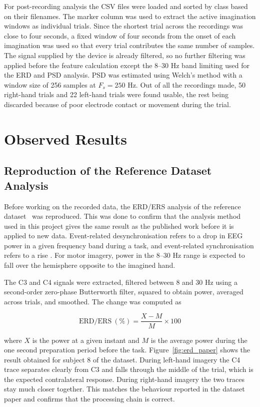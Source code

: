 For post-recording analysis the CSV files were loaded and sorted by class based on their
filenames. The marker column was used to extract the active imagination windows as
individual trials. Since the shortest trial across the recordings was close to four
seconds, a fixed window of four seconds from the onset of each imagination was used so that
every trial contributes the same number of samples. The signal supplied by the device is
already filtered, so no further filtering was applied before the feature calculation except
the 8--30 Hz band limiting used for the ERD and PSD analysis. PSD was estimated using
Welch's method \cite{welch1967} with a window size of 256 samples at $F_s = 250$ Hz. Out of all the
recordings made, 50 right-hand trials and 22 left-hand trials were found usable, the rest
being discarded because of poor electrode contact or movement during the trial.

\FloatBarrier

\section{Observed Results}

\subsection{Reproduction of the Reference Dataset Analysis}

Before working on the recorded data, the ERD/ERS analysis of the reference
dataset~\cite{liu2024mi} was reproduced. This was done to confirm that the analysis method
used in this project gives the same result as the published work before it is applied to
new data. Event-related desynchronisation refers to a drop in EEG power in a given
frequency band during a task, and event-related synchronisation refers to a rise
\cite{pfurtscheller1999erd}. For motor
imagery, power in the 8--30 Hz range is expected to fall over the hemisphere opposite to
the imagined hand.

The C3 and C4 signals were extracted, filtered between 8 and 30 Hz using a second-order
zero-phase Butterworth filter, squared to obtain power, averaged across trials, and
smoothed. The change was computed as

\begin{equation}
\mathrm{ERD/ERS}~(\%) = \frac{X - M}{M} \times 100
\end{equation}

where $X$ is the power at a given instant and $M$ is the average power during the one
second preparation period before the task. Figure~\ref{fig:erd_paper} shows the result
obtained for subject 8 of the dataset. During left-hand imagery the C4 trace separates
clearly from C3 and falls through the middle of the trial, which is the expected
contralateral response. During right-hand imagery the two traces stay much closer together.
This matches the behaviour reported in the dataset paper and confirms that the processing
chain is correct.

